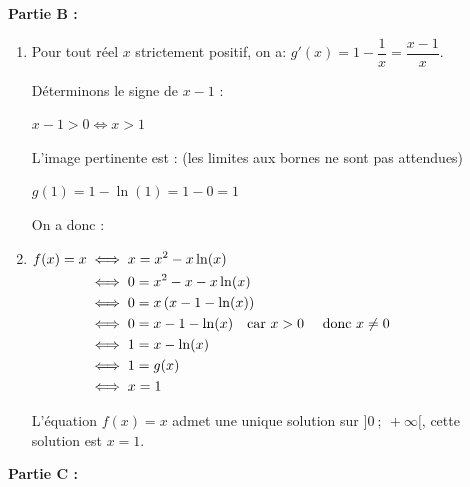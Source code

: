 \textbf{Partie B :}

\medskip

\begin{enumerate}
	\item Pour tout réel $x$ strictement positif, on a: $g'(x) =1 - \dfrac{1}{x}= \dfrac{x-1}{x}$.

Déterminons le signe de $x-1$ :

$ x-1 >0 \iff x > 1 $

L'image pertinente est : (les limites aux bornes ne sont pas attendues)

$g(1)= 1-\ln(1)=1-0=1$

On a donc :

	\item $\aligned[t] f(x) = x &\iff x = x^2-x\ln(x) \\
	&\iff 0 = x^2-x-x\ln(x) \\
	&\iff 0 = x\left( x-1-\ln(x)\right)\\
	&\iff 0 = x-1-\ln(x) \quad \text{car } x>0 \quad \text{ donc } x\neq0 \\
	& \iff 1 = x-\ln(x)\\
	&\iff 1 = g(x)\\
	&\iff x = 1 \endaligned$

L'équation $f(x)=x$ admet une unique solution sur $]0~;~+\infty[$, cette solution est $x=1$.
\end{enumerate}

\medskip

\textbf{Partie C :}

\medskip

